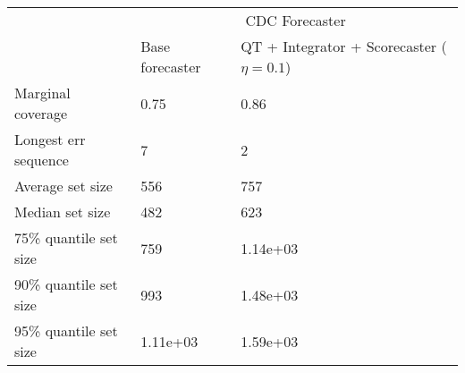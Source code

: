\begin{tabular}{lll}
\toprule
& \multicolumn{2}{c}{CDC Forecaster} \\
& Base forecaster & QT + Integrator + Scorecaster ($\eta=0.1$) \\
\midrule
Marginal coverage & 0.75 & 0.86 \\
Longest err sequence & 7 & 2 \\
Average set size & 556 & 757 \\
Median set size & 482 & 623 \\
75\% quantile set size & 759 & 1.14e+03 \\
90\% quantile set size & 993 & 1.48e+03 \\
95\% quantile set size & 1.11e+03 & 1.59e+03 \\
\bottomrule
\end{tabular}
